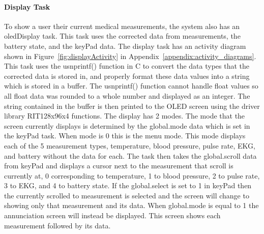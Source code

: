 \documentclass[12pt]{article} %
\begin{document}
    \paragraph{Display Task} To show a user their current medical measurements,
    the system also has an oledDisplay task. This task uses the corrected data
    from measurements, the battery state, and the keyPad data. The display task
has an activity diagram shown in Figure~\ref{fig:displayActivity} in
Appendix~\ref{appendix:activity_diagrams}. This task uses the usnprintf() function
in C to convert the data types that the corrected data is stored in, and
properly format these data values into a string which is stored in a
buffer. The usnprintf() function cannot handle float values so all float data was rounded to a whole number and displayed as an integer. 
The string contained in the buffer is then printed to the OLED
screen using the driver library RIT128x96x4 functions. The display has 2
modes. The mode that the screen currently displays is determined by the
global.mode data which is set in the keyPad task. When mode is 0 this is
the menu mode. This mode displays each of the 5 measurement types,
temperature, blood pressure, pulse rate, EKG, and battery without the data for
each. The task then takes the global.scroll data from keyPad and displays a
cursor next to the measurement that scroll is currently at, 0 corresponding
to temperature, 1 to blood pressure, 2 to pulse rate, 3 to EKG, and 4 to battery state. If the global.select is set
to 1 in keyPad then the currently scrolled to measurement is selected and
the screen will change to showing only that measurement and its data. When
global.mode is equal to 1 the annunciation screen will instead be
displayed. This screen shows each measurement followed by its data.
    
\end{document}
